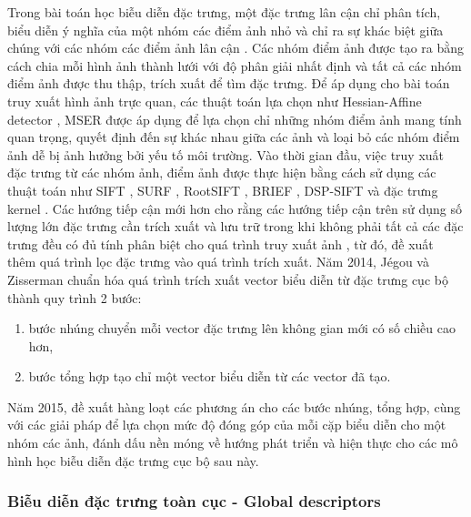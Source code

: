 Trong bài toán học biễu diễn đặc trưng, một đặc trưng lân cận chỉ phân tích, biểu diễn ý nghĩa của một nhóm các điểm ảnh nhỏ và chỉ ra sự khác biệt giữa chúng với các nhóm các điểm ảnh lân cận \cite{CGV-017-localdescriptors}. Các nhóm điểm ảnh được tạo ra bằng cách chia mỗi hình ảnh thành lưới với độ phân giải nhất định và tất cả các nhóm điểm ảnh được thu thập, trích xuất để tìm đặc trưng. Để áp dụng cho bài toán truy xuất hình ảnh trực quan, các thuật toán lựa chọn như Hessian-Affine detector \cite{hessian-affine-detector}, MSER\cite{MSER-detector} được áp dụng để lựa chọn chỉ những nhóm điểm ảnh mang tính quan trọng, quyết định đến sự khác nhau giữa các ảnh và loại bỏ các nhóm điểm ảnh dễ bị ảnh hưởng bởi yếu tố môi trường. Vào thời gian đầu, việc truy xuất đặc trưng từ các nhóm ảnh, điểm ảnh được thực hiện bằng cách sử dụng các thuật toán như SIFT \cite{lowe1999object}, SURF \cite{bay2006surf}, RootSIFT \cite{Arandjelovi2012ThreeTE}, BRIEF \cite{brief}, DSP-SIFT \cite{Dong2014DomainsizePI} và đặc trưng kernel \cite{kernel-descriptors}. Các hướng tiếp cận mới hơn cho rằng các hướng tiếp cận trên sử dụng số lượng lớn đặc trưng cần trích xuất và lưu trữ trong khi không phải tất cả các đặc trưng đều có đủ tính phân biệt cho quá trình truy xuất ảnh \cite{predicting-good-features}, từ đó, đề xuất thêm quá trình lọc đặc trưng vào quá trình trích xuất. Năm 2014, Jégou và Zisserman chuẩn hóa quá trình trích xuất vector biểu diễn từ đặc trưng cục bộ thành quy trình 2 bước\cite{Jegou_2014_CVPR}:
\begin{enumerate}
    \item bước nhúng chuyển mỗi vector đặc trưng lên không gian mới có số chiều cao hơn,
    \item bước tổng hợp tạo chỉ một vector biểu diễn từ các vector đã tạo.
\end{enumerate}
Năm 2015, \cite{selective-match-kernel} đề xuất hàng loạt các phương án cho các bước nhúng, tổng hợp, cùng với các giải pháp để lựa chọn mức độ đóng góp của mỗi cặp biểu diễn cho một nhóm các ảnh, đánh dấu nền móng về hướng phát triển và hiện thực cho các mô hình học biễu diễn đặc trưng cục bộ sau này.

\subsubsection{Biễu diễn đặc trưng toàn cục  - Global descriptors}

